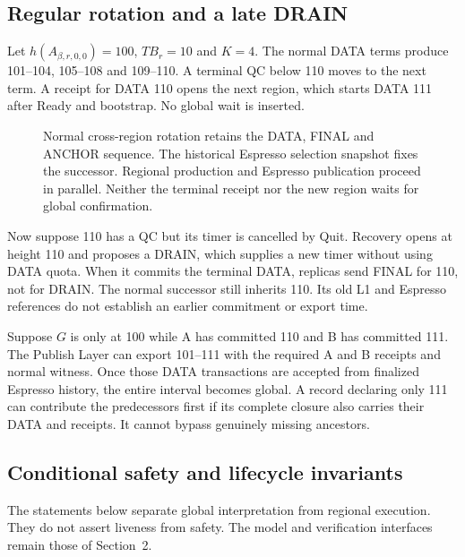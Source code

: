 \documentclass[11pt,a4paper]{article}
\newcommand{\TB}{\mathit{TB}}
\begin{document}
\subsection{Regular rotation and a late DRAIN}
\label{sec:regular-example}
Let $h(A_{\beta,r,0,0})=100$, $\TB_r=10$ and $K=4$. The normal DATA terms
produce 101--104, 105--108 and 109--110. A terminal QC below 110 moves
to the next term. A receipt for DATA 110 opens the next region, which
starts DATA 111 after Ready and bootstrap. No global wait is inserted.

\begin{figure}[htbp]\centering

\caption{Normal cross-region rotation retains the DATA, FINAL and
ANCHOR sequence. The historical Espresso selection snapshot fixes the
successor. Regional production and Espresso publication proceed in
parallel. Neither the terminal receipt nor the new region waits for
global confirmation.}
\label{fig:regular-cross-region}
\end{figure}
\FloatBarrier

Now suppose 110 has a QC but its timer is cancelled by Quit.
Recovery opens at height 110 and proposes a DRAIN, which supplies a
new timer without using DATA quota. When it commits the terminal DATA,
replicas send FINAL for 110, not for DRAIN. The normal successor still
inherits 110. Its old L1 and Espresso references do not establish an
earlier commitment or export time.

Suppose $G$ is only at 100 while A has committed 110 and B has committed
111. The Publish Layer can export 101--111 with the required A and B receipts
and normal witness. Once those DATA transactions are accepted from finalized
Espresso history, the entire interval becomes global. A record declaring
only 111 can contribute the predecessors first if its complete closure
also carries their DATA and receipts. It cannot bypass genuinely missing
ancestors.



\subsection{Conditional safety and lifecycle invariants}
\label{sec:safety-argument}
The statements below separate global interpretation from regional
execution. They do not assert liveness from safety. The model and
verification interfaces remain those of Section~2.
\end{document}
